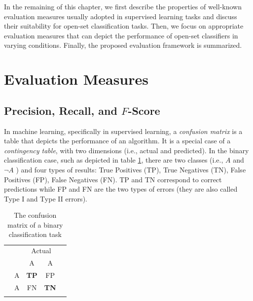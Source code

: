In the remaining of this chapter, we first describe the properties of well-known evaluation measures usually adopted in supervised learning tasks and discuss their suitability for open-set classification tasks. Then, we focus on appropriate evaluation measures that can depict the performance of open-set classifiers in varying conditions. Finally, the proposed evaluation framework is summarized.

\section{Evaluation Measures}\label{chap:eval_methods:sec:measures} 

\subsection{Precision, Recall, and $F$-Score}\label{chap:eval_methods:sec:prf_micro}

In machine learning, specifically in supervised learning, a \textit{confusion matrix} is a table that depicts the performance of an algorithm. It is a special case of a \textit{contingency table}, with two dimensions (i.e., actual and predicted). In the binary classification case, such as depicted in table \ref{chap:eval_methods:tbl:bin_confusion}, there are two classes (i.e., $A$ and $\neg A$ ) and four types of results: True Positives (TP), True Negatives (TN), False Positives (FP), False Negatives (FN). TP and TN correspond to correct predictions while FP and FN are the two types of errors (they are also called Type I and Type II errors).

\begin{table}[t]
	\center
	\caption{The confusion matrix of a binary classification task}\label{chap:eval_methods:tbl:bin_confusion}
	\begin{tabular}{c c c c c}
		& & \multicolumn{2}{c}{Actual} & \\
		\cline{3-4}
		\multirow{3}{*}{\rotatebox[origin=r]{90}{Predicted}} & & \multicolumn{1}{|c}{A} & \multicolumn{1}{c|}{\neg A} &  \\
		\cline{2-4}
		& \multicolumn{1}{|c}{A} & \multicolumn{1}{|c}{\textbf{TP}} & \multicolumn{1}{c|}{FP} & \\
		& \multicolumn{1}{|c}{\neg A} & \multicolumn{1}{|c}{FN} &  \multicolumn{1}{c|}{\textbf{TN}} \\
		\cline{2-4}
		\\
	\end{tabular}
\end{table}

